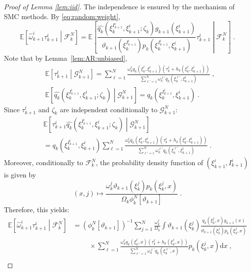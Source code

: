 \documentclass[12pt]{article}
\newcommand{\rmd}{\mathrm{d}}
\newcommand{\eqsp}{\;}
\newcommand{\1}{\mathrm{1}}
\newcommand{\qk}{q_{k}}
\begin{document}
\begin{proof}[Proof of Lemma \ref{lem:iid}]
The independence is ensured by the mechanism of SMC methods. By \eqref{eq:random:weight},
\[
\mathbb{E}\left[\widehat{\omega}^i_{k+1}\tau^{i}_{k+1}\middle| \mathcal{F}_k^{N}\right] = \mathbb{E}\left[\frac{ \widehat{\qk}(\xi_{k}^{I^{i}_{k+1}}, \xi^{i}_{k+1};\zeta_{k})g_{k+1}(\xi^{i}_{k+1})}{\vartheta_{k+1}(\xi^{I^{i}_{k+1}}_{k}) p_{k}(\xi_{k}^{I^{i}_{k+1}},\xi^{i}_{k+1})}\tau^{i}_{k+1}\middle| \mathcal{F}_k^{N}\right]\eqsp.
\]
Note that by Lemma~\ref{lem:AR:unbiased},
\begin{align*}
&\mathbb{E}\left[\tau^{i}_{k+1}\middle|\mathcal{G}_{k+1}^{N}\right]
 = \sum_{\ell=1}^N\frac{\omega_k^{\ell} \qk(\xi_{k}^{\ell}, \xi^{i}_{k+1}) \left(\tau^{\ell}_k + h_{k}(\xi_{k}^{\ell},\xi^{i}_{k+1})\right)}{\sum_{\ell'=1}^N\omega_k^{\ell'} \qk(\xi_{k}^{\ell'},\xi^{i}_{k+1})}\eqsp,\\
&\mathbb{E} \left[\widehat{\qk}(\xi_{k}^{I^{i}_{k+1}},\xi^{i}_{k+1};\zeta_{k}) \middle| \mathcal{G}_{k+1}^{N}\right]
 = \qk(\xi_{k}^{I^{i}_{k+1}},\xi^{i}_{k+1})\eqsp.
\end{align*}
Since $\tau^{i}_{k+1}$ and $\zeta_{k}$ are independent conditionally to $\mathcal{G}_{k+1}^{N}$:
\begin{multline*}
\mathbb{E}\left[\tau^{i}_{k+1} \widehat{\qk} (\xi_{k}^{I^{i}_{k+1}},\xi^{i}_{k+1};\zeta_{k})\middle|\mathcal{G}_{k+1}^{N}\right]\\
 = q_k(\xi_{k}^{I^{i}_{k+1}},\xi^{i}_{k+1})\sum_{\ell=1}^N\frac{\omega_k^{\ell} \qk (\xi_{k}^{\ell},\xi^{i}_{k+1})\left(\tau^{\ell}_k + h_{k}(\xi_{k}^{\ell},\xi^{i}_{k+1})\right)}{\sum_{\ell'=1}^N\omega_k^{\ell'} \qk (\xi_{k}^{\ell'},\xi^{i}_{k+1})}\eqsp.
\end{multline*}
Moreover, conditionally to $\mathcal{F}_k^N$, the probability density function of $(\xi_{k+1}^i,I_{k+1}^i)$ is given by
\[
(x,j) \mapsto \frac{\omega_k^j\vartheta_{k+1}(\xi_k^j)p_k(\xi_k^j,x)}{\Omega_k\phi_k^N[\vartheta_{k+1}]}\eqsp.
\]
Therefore, this yields:
\begin{align*}
\mathbb{E}\left[\widehat{\omega}^i_{k+1}\tau^{i}_{k+1}\middle| \mathcal{F}_k^{N}\right]&= \left(\phi^N_{k}[\vartheta_{k+1}]\right)^{-1} \sum_{j=1}^N\frac{\omega_k^j}{\Omega_k} \int \vartheta_{k+1}(\xi^{j}_{k})\frac{\qk(\xi_{k}^{j},x) g_{k+1}(x)}{\vartheta_{k+1}(\xi^{j}_{k}) p_{k}(\xi_{k}^{j},x)}\\
&\hspace{1cm}\times \sum_{\ell=1}^N\frac{\omega_k^{\ell} \qk (\xi_{k}^{\ell},x)\left(\tau^{\ell}_k + h_{k}(\xi_{k}^{\ell},x)\right)}{\sum_{\ell'=1}^N\omega_k^{\ell'}\qk(\xi_{k}^{\ell'},x)}p_{k}(\xi_{k}^{j},x)\rmd x\eqsp,\\

\end{align*}
\end{proof}
\end{document}
